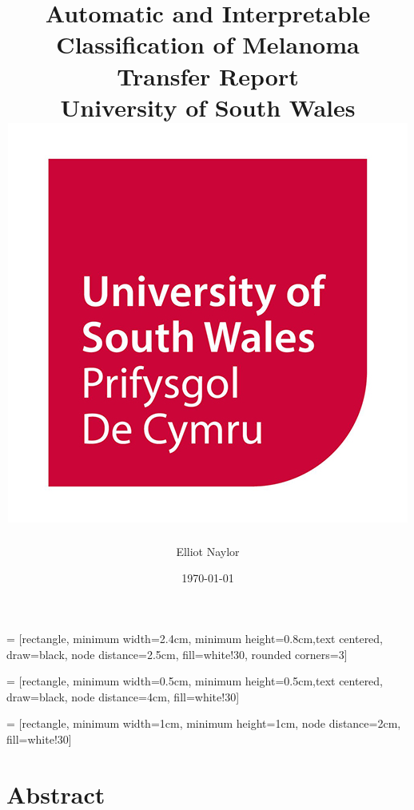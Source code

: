 \documentclass[10.5pt]{report}
\begin{document}
\title{
{\Huge Automatic and Interpretable Classification of Melanoma}
\vspace{1cm}\\
{Transfer Report}
\vspace{1cm}\\
{University of South Wales}
\vspace{1cm}\\
{\includegraphics[scale=0.4]{USW-logo.jpg}}
}

\author{Elliot Naylor}
\date{\today}

 = [rectangle, minimum width=2.4cm, minimum height=0.8cm,text centered, draw=black, node distance=2.5cm, fill=white!30, rounded corners=3]

 = [rectangle, minimum width=0.5cm, minimum height=0.5cm,text centered, draw=black, node distance=4cm, fill=white!30]

 = [rectangle, minimum width=1cm, minimum height=1cm, node distance=2cm, fill=white!30]

\maketitle
\tableofcontents
\listoffigures
\listoftables

\newpage

\chapter*{Abstract}
\end{document}
